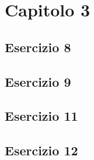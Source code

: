 \section{\textbf{Capitolo 3}}
\subsection{Esercizio 8}

\subsection{Esercizio 9}

\subsection{Esercizio 11}

\subsection{Esercizio 12}

